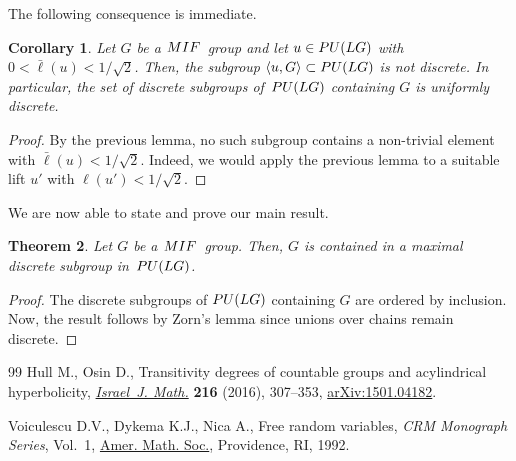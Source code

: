 \documentclass[11pt]{article}
\numberwithin{equation}{section}
\numberwithin{equation}{section}
\newtheorem{Theorem}{Theorem}[section]
\newtheorem{Corollary}[Theorem]{Corollary}
\begin{document}
The following consequence is immediate.
\begin{Corollary}
Let $G$ be a ${\rm MIF}$~group and let $u \in {\rm PU}(LG)$ with $0 < \bar \ell(u) < 1/\sqrt{2}$. Then, the subgroup $\langle u, G \rangle \subset {\rm PU}(LG)$ is not discrete.
In particular, the set of discrete subgroups of~${\rm PU}(LG)$ containing $G$ is uniformly discrete.
\end{Corollary}
\begin{proof} By the previous lemma, no such subgroup contains a non-trivial element with $\bar \ell(u)<1/\sqrt{2}$. Indeed, we would apply the previous lemma to a suitable lift $u'$ with $\ell(u')< 1/\sqrt{2}$.\end{proof}

We are now able to state and prove our main result.
\begin{Theorem} %
Let $G$ be a ${\rm MIF}$~group. Then, $G$ is contained in a maximal discrete subgroup in~${\rm PU}(LG)$.
\end{Theorem}
\begin{proof}
The discrete subgroups of ${\rm PU}(LG)$ containing $G$ are ordered by inclusion. Now, the result follows by Zorn's lemma since unions over chains remain discrete.
\end{proof}
\begin{thebibliography}{99}
Hull M., Osin D., Transitivity degrees of countable groups and acylindrical
 hyperbolicity, \href{https://doi.org/10.1007/s11856-016-1411-9}{\textit{Israel~J. Math.}} \textbf{216} (2016), 307--353,
 \href{https://arxiv.org/abs/1501.04182}{arXiv:1501.04182}.

Voiculescu D.V., Dykema K.J., Nica A., Free random variables, \textit{CRM
 Monograph Series}, Vol.~1, \href{https://doi.org/10.1090/crmm/001}{Amer. Math. Soc.}, Providence, RI, 1992.

\end{thebibliography}
\end{document}
